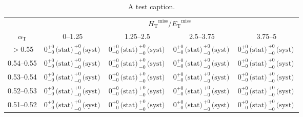 \documentclass{article}
\begin{document}
\renewcommand{\arraystretch}{1.3}
\newcommand\AlphaT{\ensuremath{\alpha_{\scriptstyle\textrm{T}}}}
\newcommand\HT{\ensuremath{H_{\scriptstyle\textrm{T}}}}
\newcommand\ET{\ensuremath{E_{\scriptstyle\textrm{T}}}}
\newcommand\MHT{\ensuremath{\HT^{\scriptstyle\textrm{miss}}}}
\newcommand\MET{\ensuremath{\ET^{\scriptstyle\textrm{miss}}}}
\newcommand\stat{\ensuremath{{\scriptstyle\,\textrm{(stat)}\,}}}
\newcommand\syst{\ensuremath{{\scriptstyle\,\textrm{(syst)}\,}}}
\newcommand{\entry}[5]{\ensuremath{#1^{+#2}_{-#3}\stat^{+#3}_{-#4}\syst}}
\newcommand{\zero}{\entry{0}{0}{0}{0}{0}}

\begin{table}[h]
  \caption{A test caption.}
  \label{tab:test}
  \centering
  \footnotesize
  \begin{tabular}{ ccccc }
    \hline
    & \multicolumn{4}{c}{\MHT/\MET} \\[0.1cm]
    \cline{2-5}
    \AlphaT & 0--1.25 & 1.25--2.5 & 2.5--3.75 & 3.75--5 \\
    \hline
    $>$0.55 & \zero & \zero & \zero & \zero \\
    0.54--0.55 & \zero & \zero & \zero & \zero \\
    0.53--0.54 & \zero & \zero & \zero & \zero \\
    0.52--0.53 & \zero & \zero & \zero & \zero \\
    0.51--0.52 & \zero & \zero & \zero & \zero \\[0.1cm]
    \hline
  \end{tabular}
\end{table}
\end{document}
